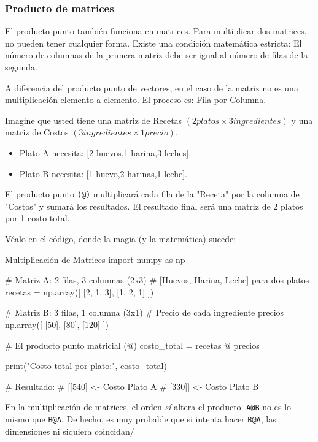 \subsubsection{Producto de matrices}

El producto punto también funciona en matrices. Para multiplicar dos matrices, no pueden tener cualquier forma. Existe una condición matemática estricta: El número de columnas de la primera matriz debe ser igual al número de filas de la segunda.

A diferencia del producto punto de vectores, en el caso de la matriz no es una multiplicación elemento a elemento. El proceso es: Fila por Columna.

Imagine que usted tiene una matriz de Recetas \((2 platos \times 3 ingredientes)\) y una matriz de Costos \((3 ingredientes \times 1 precio)\).
\begin{itemize}
\item Plato A necesita: [2 huevos,1 harina,3 leches].
\item Plato B necesita: [1 huevo,2 harinas,1 leche].
\end{itemize}
El producto punto \texttt{(@)} multiplicará cada fila de la "Receta" por la columna de "Costos" y sumará los resultados. El resultado final será una matriz de 2 platos por 1 costo total.

Véalo en el código, donde la magia (y la matemática) sucede:

\begin{pycode}{Multiplicación de Matrices}
import numpy as np

# Matriz A: 2 filas, 3 columnas (2x3)
# [Huevos, Harina, Leche] para dos platos
recetas = np.array([
[2, 1, 3],
[1, 2, 1]
])

# Matriz B: 3 filas, 1 columna (3x1)
# Precio de cada ingrediente
precios = np.array([
[50],
[80],
[120]
])

# El producto punto matricial (@)
costo_total = recetas @ precios

print("Costo total por plato:\n", costo_total)

# Resultado:
# [[540]   <- Costo Plato A
# [330]]  <- Costo Plato B
\end{pycode}

\begin{nota}
    En la multiplicación de matrices, el orden \textit{sí} altera el producto. \texttt{A@B} no es lo mismo que \texttt{B@A}. De hecho, es muy probable que si intenta hacer \texttt{B@A}, las dimensiones ni siquiera coincidan/
\end{nota}

